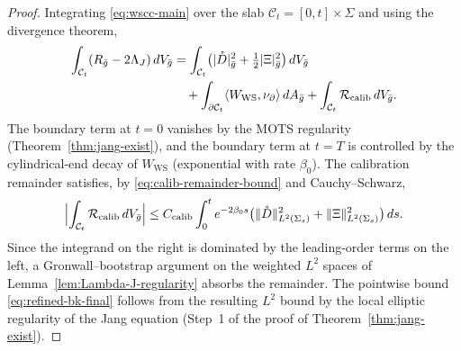 \begin{proof}
Integrating \eqref{eq:wscc-main} over the slab $\mathcal{C}_t=[0,t]\times\Sigma$ and using the divergence theorem,
\begin{align*}
\int_{\mathcal{C}_t}(R_{\bar{g}}-2\Lambda_J)\,dV_{\bar{g}} &= \int_{\mathcal{C}_t}\bigl(|\mathring{D}|^2_{\bar{g}} + \tfrac{1}{2}|\Xi|^2_{\bar{g}}\bigr)\,dV_{\bar{g}} \\
&\quad + \int_{\partial\mathcal{C}_t}\langle W_{\mathrm{WS}}, \nu_{\partial}\rangle\,dA_{\bar{g}} + \int_{\mathcal{C}_t}\mathcal{R}_{\mathrm{calib}}\,dV_{\bar{g}}.
\end{align*}
The boundary term at $t=0$ vanishes by the MOTS regularity (Theorem~\ref{thm:jang-exist}), and the boundary term at $t=T$ is controlled by the cylindrical-end decay of $W_{\mathrm{WS}}$ (exponential with rate $\beta_0$). The calibration remainder satisfies, by \eqref{eq:calib-remainder-bound} and Cauchy--Schwarz,
\[
\Bigl|\int_{\mathcal{C}_t}\mathcal{R}_{\mathrm{calib}}\,dV_{\bar{g}}\Bigr| \leq C_{\mathrm{calib}}\int_0^t e^{-2\beta_0 s}\bigl(\|\mathring{D}\|^2_{L^2(\Sigma_s)} + \|\Xi\|^2_{L^2(\Sigma_s)}\bigr)\,ds.
\]
Since the integrand on the right is dominated by the leading-order terms on the left, a Gronwall--bootstrap argument on the weighted $L^2$ spaces of Lemma~\ref{lem:Lambda-J-regularity} absorbs the remainder. The pointwise bound \eqref{eq:refined-bk-final} follows from the resulting $L^2$ bound by the local elliptic regularity of the Jang equation (Step~1 of the proof of Theorem~\ref{thm:jang-exist}).
\end{proof}

